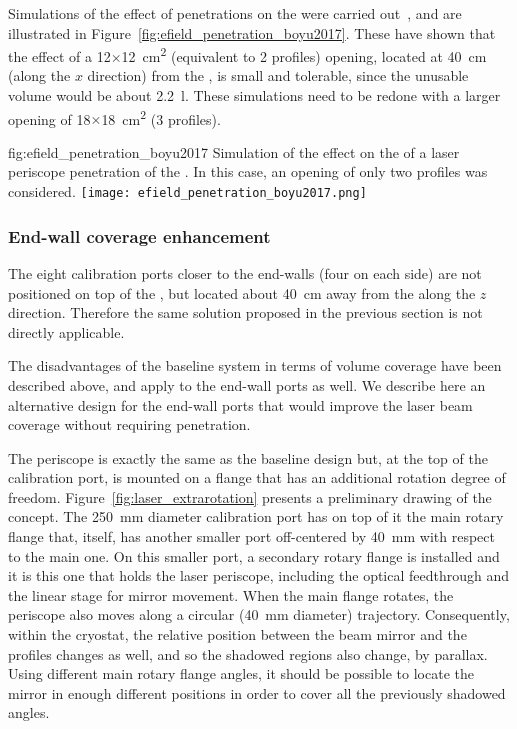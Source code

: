 Simulations of the effect of  penetrations on the \efield were carried out~\cite{bib:yu2017b}, and are illustrated in Figure~\ref{fig:efield_penetration_boyu2017}. These have shown that the effect of a \num{12}$\times$\SI{12}{\square\cm} (equivalent to \num{2} profiles) opening, located at \SI{40}{\cm} (along the $x$ direction) from the , is small and tolerable, since the unusable volume would be about \SI{2.2}{\litre}. These simulations need to be redone with a larger opening of \num{18}$\times$\SI{18}{\square\cm} (\num{3} profiles).

\begin{dunefigure}{fig:efield_penetration_boyu2017}
{Simulation of the effect on the \efield of a laser periscope penetration of the . In this case, an opening of only two profiles was considered.}
\texttt{[image: efield\_penetration\_boyu2017.png]}
\end{dunefigure}





\subsubsection{End-wall coverage enhancement}

The eight calibration ports closer to the end-walls (four on each side) are not positioned on top of the , but located about \SI{40}{\cm} away from the  along the $z$ direction.
Therefore the same solution proposed in the previous section is not directly applicable.

The disadvantages of the baseline system in terms of volume coverage have been described above, and apply to the end-wall ports as well. 
We describe here an alternative design for the end-wall ports that would improve the laser beam coverage without requiring  penetration.

The periscope is exactly the same as the baseline design but, at the top of the calibration port, is mounted on a flange that has an additional rotation degree of freedom. Figure~\ref{fig:laser_extrarotation} presents a preliminary drawing of the concept. The \SI{250}{\milli\m} diameter calibration port has on top of it the main rotary flange that, itself, has another smaller port off-centered by \SI{40}{\milli\m} with respect to the main one. On this smaller port, a secondary rotary flange is installed and it is this one that holds the laser periscope, including the optical feedthrough and the linear stage for mirror movement. When the main flange rotates, the periscope also moves along a circular (\SI{40}{\milli\m} diameter) trajectory. Consequently, within the cryostat, the relative position between the beam mirror and the  profiles changes as well, and so the shadowed regions also change, by parallax. Using different main rotary flange angles, it should be possible to locate the mirror in enough different positions in order to cover all the previously shadowed angles.

